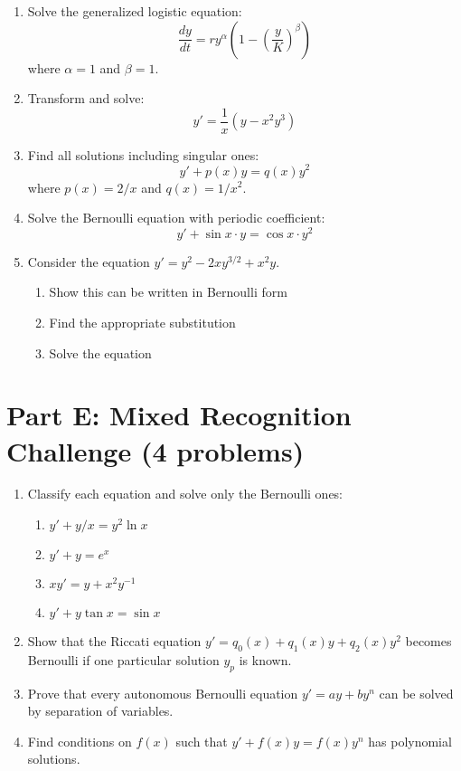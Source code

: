 \documentclass[12pt]{article}
\begin{document}
\begin{enumerate}[resume]
    \item Solve the generalized logistic equation:
    $$\frac{dy}{dt} = ry^{\alpha}\left(1 - \left(\frac{y}{K}\right)^{\beta}\right)$$
    where $\alpha = 1$ and $\beta = 1$.

    \item Transform and solve:
    $$y' = \frac{1}{x}(y - x^2y^3)$$

    \item Find all solutions including singular ones:
    $$y' + p(x)y = q(x)y^2$$
    where $p(x) = 2/x$ and $q(x) = 1/x^2$.

    \item Solve the Bernoulli equation with periodic coefficient:
    $$y' + \sin x \cdot y = \cos x \cdot y^2$$

    \item Consider the equation $y' = y^2 - 2xy^{3/2} + x^2y$.
    \begin{enumerate}
        \item Show this can be written in Bernoulli form
        \item Find the appropriate substitution
        \item Solve the equation
    \end{enumerate}
\end{enumerate}

\section*{Part E: Mixed Recognition Challenge (4 problems)}

\begin{enumerate}[resume]
    \item Classify each equation and solve only the Bernoulli ones:
    \begin{enumerate}
        \item $y' + y/x = y^2\ln x$
        \item $y' + y = e^x$
        \item $xy' = y + x^2y^{-1}$
        \item $y' + y\tan x = \sin x$
    \end{enumerate}

    \item Show that the Riccati equation $y' = q_0(x) + q_1(x)y + q_2(x)y^2$ becomes Bernoulli if one particular solution $y_p$ is known.

    \item Prove that every autonomous Bernoulli equation $y' = ay + by^n$ can be solved by separation of variables.

    \item Find conditions on $f(x)$ such that $y' + f(x)y = f(x)y^n$ has polynomial solutions.
\end{enumerate}
\end{document}
